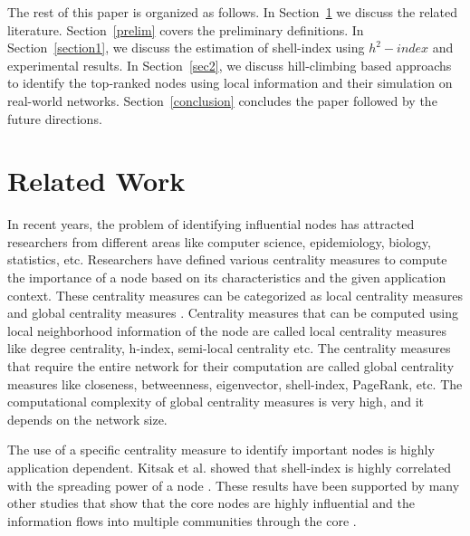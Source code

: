 \documentclass[conference]{IEEEtran}
\begin{document}
The rest of this paper is organized as follows. In Section~\ref{relwork} we discuss the related literature. Section~\ref{prelim} covers the preliminary definitions. In Section~\ref{section1}, we discuss the estimation of shell-index using $h^2-index$ and experimental results. In Section~\ref{sec2}, we discuss hill-climbing based approachs to identify the top-ranked nodes using local information and their simulation on real-world networks. Section~\ref{conclusion} concludes the paper followed by the future directions.

\section{Related Work}\label{relwork}


In recent years, the problem of identifying influential nodes has attracted researchers from different areas like computer science, epidemiology, biology, statistics, etc. Researchers have defined various centrality measures to compute the importance of a node based on its characteristics and the given application context. These centrality measures can be categorized as local centrality measures and global centrality measures \cite{saxena2017global}. Centrality measures that can be computed using local neighborhood information of the node are called local centrality measures like degree centrality, h-index, semi-local centrality etc. The centrality measures that require the entire network for their computation are called global centrality measures like closeness, betweenness, eigenvector, shell-index, PageRank, etc. The computational complexity of global centrality measures is very high, and it depends on the network size.

The use of a specific centrality measure to identify important nodes is highly application dependent. Kitsak et al. showed that shell-index is highly correlated with the spreading power of a node \cite{kitsak2010identification}. These results have been supported by many other studies that show that the core nodes are highly influential and the information flows into multiple communities through the core \cite{saxena2015understanding}.
\end{document}
